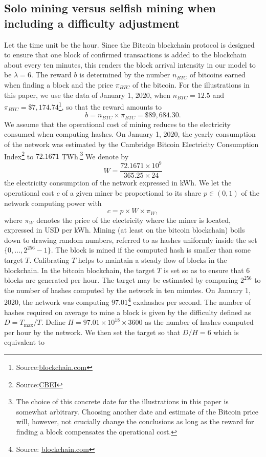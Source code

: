 \subsection{Solo mining versus selfish mining when including a difficulty adjustment}\label{ssec:solo_mining_VS_selfish_mining}
Let the time unit be the hour. Since the Bitcoin blockchain protocol is designed to ensure that one block of confirmed transactions is added to the blockchain about every ten minutes, this renders the block arrival intensity in our model to be $\lambda = 6$. The reward $b$ is determined by the number $n_{BTC}$ of bitcoins earned when finding a block and the price $\pi_{BTC}$ of the bitcoin. For the illustrations in this paper, we use the data of January 1, $2020$, when $n_{BTC}=12.5$ and $\pi_{BTC} =\$7,174.74$\footnote{Source:\href{https://www.blockchain.com/}{blockchain.com}}, so that the reward amounts to
$$
b = n_{BTC}\times \pi_{BTC} = \$89,684.30.
$$
We assume that the operational cost of mining reduces to the electricity consumed when computing hashes. On January 1,  $2020$, the yearly consumption of the network was estimated by the Cambridge Bitcoin Electricity Consumption Index\footnote{Source:\href{https://www.cbeci.org/}{CBEI}} to $72.1671$ TWh.\footnote{The choice of this concrete date for the illustrations in this paper is somewhat arbitrary. Choosing another date and estimate of the Bitcoin price will, however, not crucially change the conclusions as long as the reward for finding a block compensates the operational cost.    
} We denote by 
$$
W = \frac{72.1671\times 10^9}{365.25\times 24}
$$
the electricity consumption of the network expressed in kWh. We let the operational cost $c$ of a given miner be proportional to its share $p\in(0,1)$ of the network computing power with 
$$
c = p\times W \times \pi_W,
$$  
where $\pi_W$ denotes the price of the electricity where the miner is located, expressed in USD per kWh. Mining (at least on the bitcoin blockchain) boils down to drawing random numbers, referred to as hashes uniformly inside the set $\{0,\ldots, 2^{256}-1\}$. The block is mined if the computed hash is smaller than some target $T$. Calibrating $T$ helps to maintain a steady flow of blocks in the blockchain. In the bitcoin blockchain, the target $T$ is set so as to ensure that $6$ blocks are generated per hour. The target may be estimated by comparing $2^{256}$ to the number of hashes computed by the network in ten minutes. On January 1, 2020, the network was computing $97.01$\footnote{Source: \href{https://www.blockchain.com/}{blockchain.com}} exahashes per second. The number of hashes required on average to mine a block is given by the difficulty defined as $D = T_{\max}/T$. Define $H= 97.01 \times 10^{18} \times 3600$ as the number of hashes computed per hour by the network. We then set the target so that $D / H = 6$ which is equivalent to 
